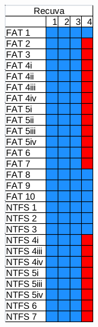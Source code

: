 \begin{figure}
\begin{subfigure}{0.16\linewidth}
    \end{subfigure}    
    \begin{subfigure}{0.16\linewidth}
        \includegraphics[width=\linewidth]{fig/recuva_results.png}

\end{subfigure}
\end{figure}
